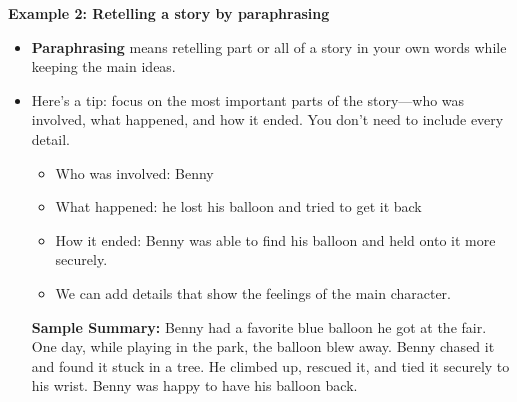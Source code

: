 \documentclass[12pt]{article}
\begin{document}
\begin{tcolorbox}[colframe=black!60, colback=white, 
coltitle=black, colbacktitle=black!15, fonttitle=\bfseries\Large, 
title=Examples, halign title=center, left=10pt, right=10pt, top=10pt, bottom=15pt]

\textbf{Example 2: Retelling a story by paraphrasing}
\begin{itemize}
    
    \item \textbf{Paraphrasing} means retelling part or all of a story in your own words while keeping the main ideas. 
    \item Here’s a tip: focus on the most important parts of the story—who was involved, what happened, and how it ended. You don’t need to include every detail. 
    \begin{itemize}
        \item Who was involved: Benny
        \item What happened: he lost his balloon and tried to get it back
        \item How it ended: Benny was able to find his balloon and held onto it more securely.
        \item We can add details that show the feelings of the main character.
    \end{itemize}
     

\textbf{Sample Summary:} Benny had a favorite blue balloon he got at the fair. One day, while playing in the park, the balloon blew away. Benny chased it and found it stuck in a tree. He climbed up, rescued it, and tied it securely to his wrist. Benny was happy to have his balloon back.
    



\end{itemize}

     \end{tcolorbox}
\vspace{1em}


 
\end{document}
